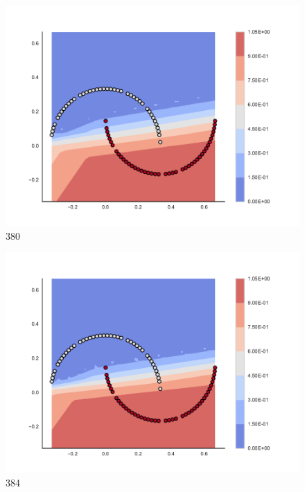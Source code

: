 \begin{subfigure}[b]{0.09\textwidth}
    \includegraphics[clip, trim=2.35cm 1.75cm 4.5cm 0cm,width=\textwidth]{img/convergence/380.pdf}
    \caption{380}
    \label{fig:convergence_380}
\end{subfigure}
%
\begin{subfigure}[b]{0.09\textwidth}
    \includegraphics[clip, trim=2.35cm 1.75cm 4.5cm 0cm,width=\textwidth]{img/convergence/384.pdf}
    \caption{384}
    \label{fig:convergence_384}
\end{subfigure}
%
